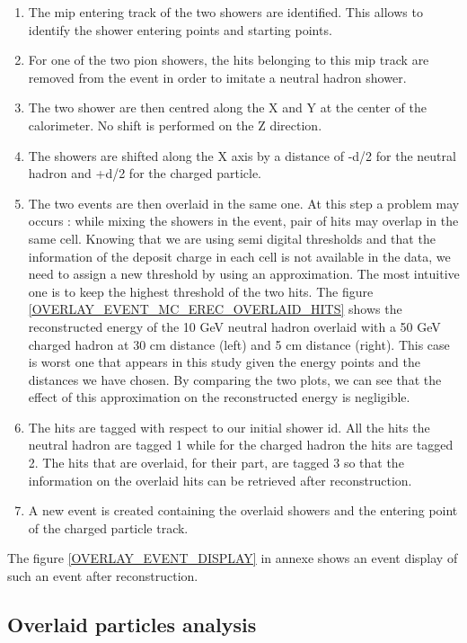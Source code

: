 \documentclass[cits]{JINST}
\begin{document}
\begin{enumerate}
  \item The mip entering track of the two showers are identified. This allows to identify the shower entering points and starting points.
  \item For one of the two pion showers, the hits belonging to this mip track are removed from the event in order to imitate a neutral hadron shower.
  \item The two shower are then centred along the X and Y at the center of the calorimeter. No shift is performed on the Z direction.
  \item The showers are shifted along the X axis by a distance of -d/2 for the neutral hadron and +d/2 for the charged particle.
  \item The two events are then overlaid in the same one. At this step a problem may occurs : while mixing the showers in the event, pair of hits may overlap in the same cell. Knowing that we are using semi digital thresholds and that the information of the deposit charge in each cell is not available in the data, we need to assign a new threshold by using an approximation. The most intuitive one is to keep the highest threshold of the two hits. The figure \ref{OVERLAY_EVENT_MC_EREC_OVERLAID_HITS} shows the reconstructed energy of the 10 GeV neutral hadron overlaid with a 50 GeV charged hadron at 30 cm distance (left) and 5 cm distance (right). This case is worst one that appears in this study given the energy points and the distances we have chosen. By comparing the two plots, we can see that the effect of this approximation on the reconstructed energy is negligible.
  \item The hits are tagged with respect to our initial shower id. All the hits the neutral hadron are tagged 1 while for the charged hadron the hits are tagged 2. The hits that are overlaid, for their part, are tagged 3 so that the information on the overlaid hits can be retrieved after reconstruction.
  \item A new event is created containing the overlaid showers and the entering point of the charged particle track.
\end{enumerate}

The figure \ref{OVERLAY_EVENT_DISPLAY} in annexe shows an event display of such an event after reconstruction.

\subsection{Overlaid particles analysis}
\end{document}
